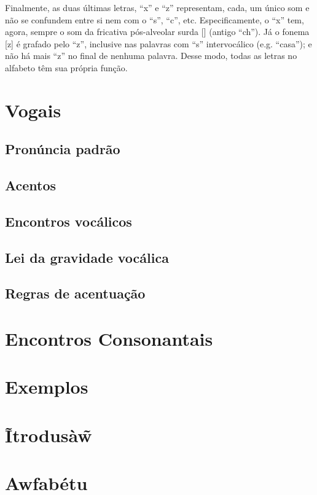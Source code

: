 \documentclass[12pt, a4paper]{article}
\begin{document}
\begin{bilingualpages}
    Finalmente, as duas últimas letras, ``x'' e ``z'' representam, cada, um único som e não se confundem entre si nem com o ``s'', ``c'', etc. Especificamente, o ``x'' tem, agora, sempre o som da fricativa pós-alveolar surda [\textesh] (antigo ``ch''). Já o fonema [z] é grafado pelo ``z'', inclusive nas palavras com ``s'' intervocálico (e.g. ``casa''); e não há mais ``z'' no final de nenhuma palavra. Desse modo, todas as letras no alfabeto têm sua própria função.

    \section{Vogais}

    \subsection{Pronúncia padrão}
    \subsection{Acentos}
    \subsection{Encontros vocálicos}
    \subsection{Lei da gravidade vocálica}
    \subsection{Regras de acentuação}
    
    \section{Encontros Consonantais}
    
    \section{Exemplos}
    
    \leftpage
    \section{Ĩtrodusà\~{w}}
    
    \newpage
    \section{Awfabétu}
    \BrTableAbc


\end{bilingualpages}
\end{document}
